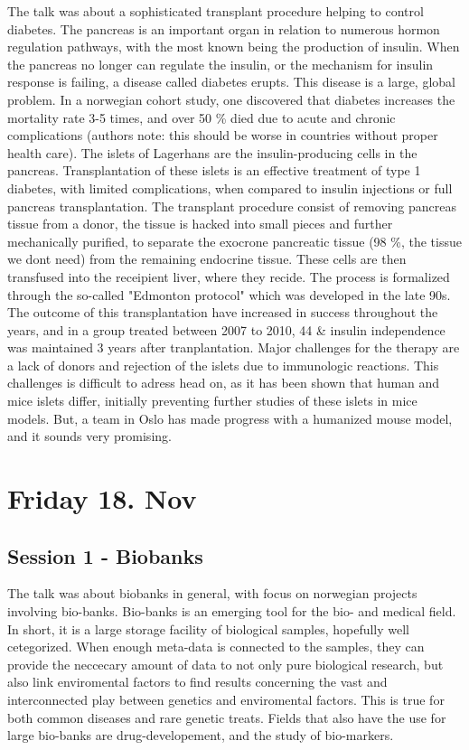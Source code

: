 \documentclass[12p]{article}
\begin{document}
The talk was about a sophisticated transplant procedure helping to control diabetes.
The pancreas is an important organ in relation to numerous hormon regulation pathways, with the most known being the production of insulin.
When the pancreas no longer can regulate the insulin, or the mechanism for insulin response is failing, a disease called diabetes erupts.
This disease is a large, global problem.
In a norwegian cohort study, one discovered that diabetes increases the mortality rate 3-5 times, and over 50 \% died due to acute and chronic complications (authors note: this should be worse in countries without proper health care).
The islets of Lagerhans are the insulin-producing cells in the pancreas.
Transplantation of these islets is an effective treatment of type 1 diabetes, with limited complications, when compared to insulin injections or full pancreas transplantation.
The transplant procedure consist of removing pancreas tissue from a donor, the tissue is hacked into small pieces and further mechanically purified, to separate the exocrone pancreatic tissue (98 \%, the tissue we dont need) from the remaining endocrine tissue.
These cells are then transfused into the receipient liver, where they recide.
The process is formalized through the so-called "Edmonton protocol" which was developed in the late 90s.
The outcome of this transplantation have increased in success throughout the years, and in a group treated between 2007 to 2010, 44 \& insulin independence was maintained 3 years after tranplantation.
Major challenges for the therapy are a lack of donors and rejection of the islets due to immunologic reactions.
This challenges is difficult to adress head on, as it has been shown that human and mice islets differ, initially preventing further studies of these islets in mice models.
But, a team in Oslo has made progress with a humanized mouse model, and it sounds very promising. 


\section*{Friday 18. Nov}

\subsection*{Session 1 - Biobanks}

The talk was about biobanks in general, with focus on norwegian projects involving bio-banks.
Bio-banks is an emerging tool for the bio- and medical field.
In short, it is a large storage facility of biological samples, hopefully well cetegorized.
When enough meta-data is connected to the samples, they can provide the neccecary amount of data to not only pure biological research, but also link enviromental factors to find results concerning the vast and interconnected play between genetics and enviromental factors.
This is true for both common diseases and rare genetic treats.
Fields that also have the use for large bio-banks are drug-developement, and the study of bio-markers.
\end{document}
